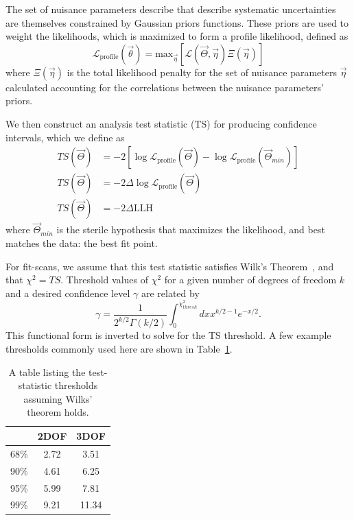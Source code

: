 \documentclass[main.tex]{subfiles}
\begin{document}
The set of nuisance parameters describe that describe systematic uncertainties are themselves constrained by Gaussian priors functions. 
These priors are used to weight the likelihoods, which is maximized to form a profile likelihood, defined as 
\begin{equation}
\mathcal{L}_{\text{profile}}\left(\vec{\theta}\right) = \text{max}_{\vec{\eta}}\left[\mathcal{L}(\vec{\Theta}, \vec{\eta}) \Xi(\vec{\eta}) \right]
\end{equation}
where $\Xi(\vec{\eta})$ is the total likelihood penalty for the set of nuisance parameters $\vec{\eta}$ calculated accounting for the correlations between the nuisance parameters' priors. 

We then construct an analysis test statistic (TS) for producing confidence intervals, which we define as 
\begin{equation}\begin{split}
TS(\vec{\Theta}) &= -2\left[ \log\mathcal{L}_{\text{profile}}(\vec{\Theta}) - \log\mathcal{L}_{\text{profile}}(\vec{\Theta}_{min}) \right] \\
TS(\vec{\Theta}) &= -2 \Delta \log\mathcal{L}_{\text{profile}}(\vec{\Theta})\\
TS(\vec{\Theta}) &=-2\Delta \text{LLH}
\end{split}\end{equation}
where $\vec{\Theta}_{min}$ is the sterile hypothesis that maximizes the likelihood, and best matches the data: the best fit point. 

For fit-scans, we assume that this test statistic satisfies Wilk's Theorem~\cite{10.1214/aoms/1177732360}, and that $\chi^{2}= TS$. 
Threshold values of $\chi^{2}$ for a given number of degrees of freedom $k$ and a desired confidence level $\gamma$ are related by 
\begin{equation}
    \gamma = \dfrac{1}{2^{k/2} \Gamma(k/2)} \int_{0}^{\chi^{2}_{thresh}} dx x^{k/2 - 1} e^{-x/2}. 
\end{equation}
This functional form is inverted to solve for the TS threshold. A few example thresholds commonly used here are shown in Table~\ref{table:tsthresh}.
\begin{table}
    \centering
    \begin{tabular}{c | c c}\rowcolor{blue!25}
        & 2DOF & 3DOF \\\hline
    68\% & 2.72 & 3.51 \\
    90\% & 4.61 & 6.25 \\ 
    95\% & 5.99 & 7.81 \\
    99\% & 9.21 & 11.34 
    \end{tabular}
    \caption{A table listing the test-statistic thresholds assuming Wilks' theorem holds.}\label{table:tsthresh}
\end{table}
\end{document}
